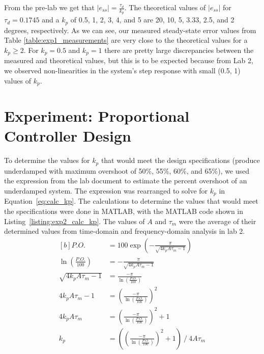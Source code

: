 \documentclass[12pt]{article}
\begin{document}
From the pre-lab we get that $\left|e_{ss}\right| = \frac{\tau_d}{k_p}$. The theoretical values of $\left|e_{ss}\right|$ for $\tau_d = 0.1745$ and a $k_p$ of 0.5, 1, 2, 3, 4, and 5 are 20, 10, 5, 3.33, 2.5, and 2 degrees, respectively. As we can see, our measured steady-state error values from Table \ref{table:exp1_measurements} are very close to the theoretical values for a $k_p \geq 2$. For $k_p = 0.5$ and $k_p = 1$ there are pretty large discrepancies between the measured and theoretical values, but this is to be expected because from Lab 2, we observed non-linearities in the system's step response with small (0.5, 1) values of $k_p$.

\section{Experiment: Proportional Controller Design}
To determine the values for $k_p$ that would meet the design specifications (produce underdamped with maximum overshoot of 50\%, 55\%, 60\%, and 65\%), we used the expression from the lab document to estimate the percent overshoot of an underdamped system. The expression was rearranged to solve for $k_p$ in Equation~\ref{eq:calc_kp}. The calculations to determine the values that would meet the specifications were done in MATLAB, with the MATLAB code shown in Listing~\ref{listing:exp2_calc_kp}. The values of $A$ and $\tau_m$ were the average of their determined values from time-domain and frequency-domain analysis in lab 2.
\begin{equation} \label{eq:calc_kp}
\begin{aligned}[b]
    P.O. &= 100\exp\left( -\frac{\pi}{\sqrt{4k_pA\tau_m-1}} \right) \\
    \ln\left(\frac{P.O.}{100}\right) &= -\frac{\pi}{\sqrt{4k_pA\tau_m-1}} \\
    \sqrt{4k_pA\tau_m-1} &= \frac{-\pi}{\ln\left(\frac{P.O.}{100}\right)} \\
    4k_pA\tau_m - 1 &= \left(\frac{-\pi}{\ln\left(\frac{P.O.}{100}\right)}\right)^2 \\
    4k_pA\tau_m &= \left(\frac{-\pi}{\ln\left(\frac{P.O.}{100}\right)}\right)^2 + 1 \\
    k_p &= \left( \left(\frac{-\pi}{\ln\left(\frac{P.O.}{100}\right)}\right)^2 + 1 \right) \ / \ 4A\tau_m
\end{aligned}
\end{equation}

\end{document}
